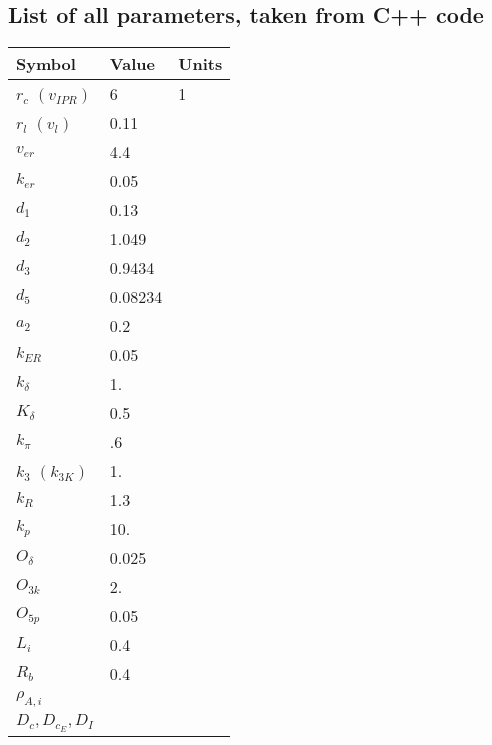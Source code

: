 \documentclass[11pt]{article}
\begin{document}
\subsection{List of all parameters, taken from C++ code}
\begin{table}[h]
\begin{tabular}{|lll|}
\hline
Symbol & Value & Units \\ \hline
$r_c$ $(v_{IPR})$ & 6 & 1 \\
$r_l$ $(v_l)$  & 0.11  &\\
$v_{er}$ & 4.4  &\\
$k_{er}$ & 0.05 &\\ \hline
$d_{1}$ & 0.13  &\\
$d_{2}$ & 1.049  &\\
$d_{3}$ & 0.9434 &\\
$d_{5}$ &  0.08234 &\\ \hline
$a_{2}$ &  0.2 &\\ \hline
$k_{ER}$ & 0.05 &\\
$k_{\delta}$ & 1. &\\
$K_{\delta}$ & 0.5  &\\
$k_{\pi}$ & .6 &\\
$k_3$ $(k_{3K})$ & 1. &\\     %
$k_R$ & 1.3 &\\
$k_p$ & 10. &\\ \hline
$O_{\delta}$ & 0.025 &\\
$O_{3k}$ & 2. &\\
$O_{5p}$ & 0.05 &\\ \hline
$L_i$ & 0.4 & \\ 
$R_b$ & 0.4 & \\  
$\rho_{A,i}$ & & \\  
$D_c, D_{c_E}, D_I$ & & \\ \hline
\end{tabular}
\end{table}

\end{document}
